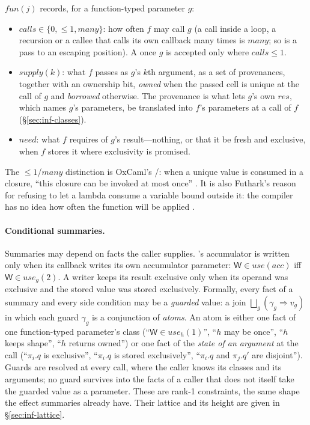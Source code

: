 $\mathit{fun}(j)$ records, for a function-typed parameter $g$:
\begin{itemize}
\item $\mathit{calls} \in \{0, {\le}1, \mathit{many}\}$: how often $f$ may call $g$ (a call inside a
loop, a recursion or a callee that calls its own callback many times is $\mathit{many}$; so is a pass
to an escaping position). A once $g$ is accepted only where $\mathit{calls} \le 1$.
\item $\mathit{supply}(k)$: what $f$ passes as $g$'s $k$th argument, as a set of provenances, together
with an ownership bit, \emph{owned} when the passed cell is unique at the call of $g$ and \emph{borrowed}
otherwise. The provenance is what lets $g$'s own $\mathit{res}$, which names $g$'s parameters, be
translated into $f$'s parameters at a call of $f$ (\S\ref{sec:inf-classes}).
\item $\mathit{need}$: what $f$ requires of $g$'s result---nothing, or that it be fresh and exclusive, when
$f$ stores it where exclusivity is promised.
\end{itemize}
The ${\le}1$/$\mathit{many}$ distinction is OxCaml's /: when a unique value is
consumed in a closure, ``this closure can be invoked at most once''
\citep{oxcaml2025uniqueness,lorenzen2024oxidizing}. It is also Futhark's reason for refusing to let a
lambda consume a variable bound outside it: the compiler has no idea how often the function will be
applied \citep{henriksen2022uniqueness}.

\paragraph{Conditional summaries.} Summaries may depend on facts the caller supplies.
's accumulator is written only when its callback writes its own accumulator
parameter: $\mathsf{W} \in \mathit{use}(\mathit{acc})$ iff $\mathsf{W} \in \mathit{use}_g(2)$. A writer
keeps its result exclusive only when its operand was exclusive and the stored value was stored
exclusively. Formally, every fact of a summary and every side condition may be a \emph{guarded} value:
a join $\bigsqcup_g (\gamma_g \Rightarrow v_g)$ in which each guard $\gamma_g$ is a conjunction of
\emph{atoms}. An atom is either one fact of one function-typed parameter's class
(``$\mathsf{W} \in \mathit{use}_h(1)$'', ``$h$ may be once'', ``$h$ keeps shape'', ``$h$ returns owned'')
or one fact of the \emph{state of an argument} at the call (``$\pi_i.q$ is exclusive'', ``$\pi_i.q$ is
stored exclusively'', ``$\pi_i.q$ and $\pi_j.q'$ are disjoint''). Guards are resolved at every call, where
the caller knows its classes and its arguments; no guard survives into the facts of a caller that does
not itself take the guarded value as a parameter. These are rank-1 constraints, the same shape the
effect summaries already have. Their lattice and its height are given in \S\ref{sec:inf-lattice}.

